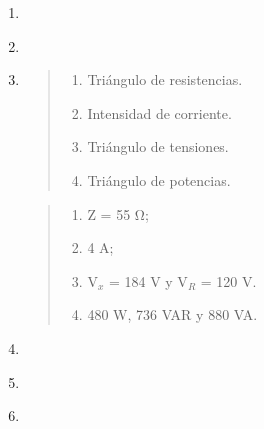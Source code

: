 \documentclass[spanish,openany]{report}
\begin{document}
\begin{enumerate}
\begin{quote}
		\end{quote}
		
	\item{}
		\begin{quote}
		\end{quote}
		
	\item
		\begin{quote}
		\end{quote}
		
	\item{}



		\begin{quote}
			\begin{enumerate}[label=\alph*)]
				\item Triángulo de resistencias.
				\item Intensidad de corriente.
				\item Triángulo de tensiones.
				\item Triángulo de potencias.
			\end{enumerate}

		\end{quote}
	\begin{quote}
		\begin{enumerate}[label=\alph*)]
			\item Z = 55 \si{\ohm};
			\item 4 A;
			\item V$_x$ = 184 V y V$_R$ = 120 V.
			\item 480 W, 736 VAR y 880 VA.
			\end{enumerate}
	\end{quote}
	\item
		\begin{quote}
		\end{quote}
		
	\item
		\begin{quote}
		\end{quote}
		
	\item
		\begin{quote}
		\end{quote}
		

\end{enumerate}
\end{document}
